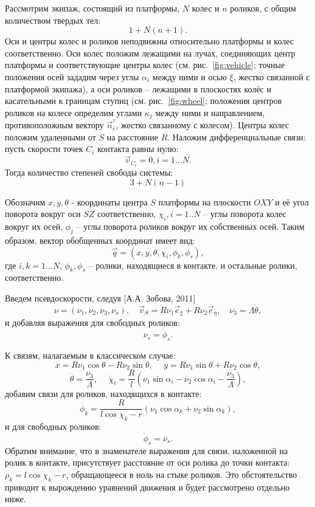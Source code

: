 Рассмотрим экипаж, состоящий из платформы, $N$ колес и $n$ роликов, с общим количеством твердых тел:
$$1 + N(n+1).$$
Оси и центры колес и роликов неподвижны относительно платформы и колес соответственно. Оси колес положим лежащими на лучах, соединяющих центр платформы и соответствующие центры колес (см. рис.~\ref{fig:vehicle}; точные положения осей зададим через углы $\alpha_i$ между ними и осью $\xi$, жестко связанной с платформой экипажа), а оси роликов -- лежащими в плоскостях колёс и касательными к границам ступиц (см. рис.~\ref{fig:wheel}; положения центров роликов на колесе определим углами $\kappa_j$ между ними и направлением, противоположным вектору $\vec{n}_i^z$, жестко связанному с колесом). Центры колес положим удаленными от $S$ на расстояние $R$. Наложим дифференциальные связи: пусть скорости точек $C_i$ контакта равны нулю:
$$\vec{v}_{C_i} = 0, i = 1\dots N.$$
Тогда количество степеней свободы системы:
$$3 + N(n-1)$$

Обозначим $x, y, \theta$ - координаты центра $S$ платформы на плоскости $OXY$ и её угол поворота вокруг оси $SZ$ соответственно, $\chi_i, i = 1..N$ -- углы поворота колес вокруг их осей, $\phi_j$ -- углы поворота роликов вокруг их собственных осей. Таким образом, вектор обобщенных координат имеет вид:
$$\vec{q} = (x, y, \theta, \chi_i, \phi_k, \phi_s),$$
где $i,k = 1\dots N$, $\phi_k, \phi_s$ -- ролики, находящиеся в контакте, и остальные ролики, соответственно.

Введем псевдоскорости, следуя [А.А. Зобова, 2011]
$$\nu = (\nu_1, \nu_2, \nu_3, \nu_s), \quad \vec{v}_S = R\nu_1\vec{e}_\xi + R\nu_2\vec{e}_\eta, \quad \nu_3 = \Lambda\dot{\theta},$$
и добавляя выражения для свободных роликов:
$$\nu_s = \dot{\phi}_s.$$

К связям, налагаемым в классическом случае:
$$ \dot{x} = R \nu_1\cos\theta-R\nu_2\sin\theta, \hspace{15pt} \dot{y} = R\nu_1\sin\theta+R\nu_2\cos\theta,$$
$$\dot{\theta} = \frac{\nu_3}{\Lambda}, \hspace{15pt} \dot{\chi}_i = \frac{R}{l}(\nu_1\sin\alpha_i - \nu_2\cos\alpha_i - \frac{\nu_3}{\Lambda}),$$
добавим связи для роликов, находящихся в контакте:
$$ \dot{\phi_k} = \frac{R}{l\cos\chi_k-r}(\nu_1\cos\alpha_k + \nu_2\sin\alpha_k),$$
и для свободных роликов:
$$\dot{\phi}_s = \nu_s.$$
Обратим внимание, что в знаменателе выражения для связи, наложенной на ролик в контакте, присутствует расстояние от оси ролика до точки контакта: $\rho_k = l\cos\chi_k - r$, обращающееся в ноль на стыке роликов. Это обстоятельство приводит к вырождению уравнений движения и будет рассмотрено отдельно ниже.

